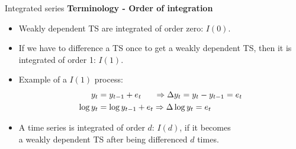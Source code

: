 \documentclass{beamer}
\begin{document}

\begin{frame}{Integrated series}
\textbf{Terminology - Order of integration }
\vspace{0.5cm}
\begin{itemize}
\item Weakly dependent TS are integrated of order zero: $I(0)$.
\vspace{0.2cm}
\item If we have to difference a TS once to get a weakly dependent TS, then it is integrated of order 1: $I(1)$.
\vspace{0.2cm}
\item Example of a $I(1)$ process:
\begin{align}\nonumber
y_t & =y_{t-1}+e_t  \hspace{0.55cm} \Rightarrow \Delta y_t = y_t-y_{t-1}=e_t \\\nonumber
 \log{y_t} & =\log{y_{t-1}}+e_t  \Rightarrow \Delta \log{y_t}=e_t
 \end{align} 
 \item A time series is integrated of order $d$: $I(d)$, if it becomes \\a weakly dependent TS after being differenced $d$ times.
\end{itemize}
\end{frame}

\end{document}

